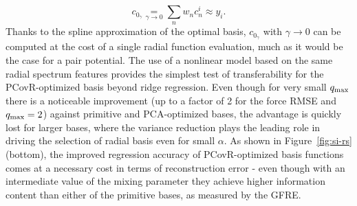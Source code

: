 \begin{equation}
  c_{0_\gamma} \underset{\gamma\rightarrow 0}{=} 
  \sum_n w_n c^i_{n} \approx y_i.
\end{equation}
Thanks to the spline approximation of the optimal basis, $c_{0_\gamma}$ with $\gamma\rightarrow 0$ can be computed at the cost of a single radial function evaluation, much as it would be the case for a pair potential. 
The use of a nonlinear model based on the same radial spectrum features provides the simplest test of transferability for the PCovR-optimized basis beyond ridge regression. 
Even though for very small $q_\mathrm{max}$ there is a noticeable improvement (up to a factor of 2 for the force RMSE and $q_\mathrm{max}=2$) against primitive and PCA-optimized bases, the advantage is quickly lost for larger bases, where the variance reduction plays the leading role in driving the selection of radial basis even for small $\alpha$.
As shown in Figure~\ref{fig:si-rs} (bottom), the improved regression accuracy of PCovR-optimized basis functions comes at a necessary cost in terms of reconstruction error - even though with an intermediate value of the mixing parameter they achieve higher information content than either of the primitive bases, as measured by the GFRE.

